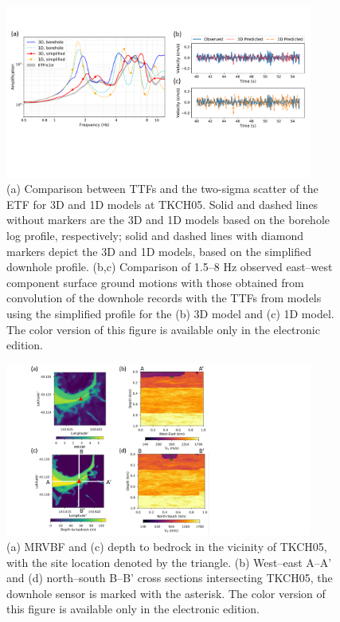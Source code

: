 {\clearpage
\begin{figure}[!ht]
  \centering
  \includegraphics[width=0.9\textwidth]{figures/figure_etf_7.pdf}
  \caption{(a) Comparison between TTFs and the two-sigma scatter of the ETF for 3D and 1D models at TKCH05. Solid and dashed lines without markers are the 3D and 1D models based on the borehole log profile, respectively; solid and dashed lines with diamond markers depict the 3D and 1D models, based on the simplified downhole profile. (b,c) Comparison of 1.5–8 Hz observed east–west component surface ground motions with those obtained from convolution of the downhole records with the TTFs from models using the simplified profile for the (b) 3D model and (c) 1D model. The color version of this figure is available only in the electronic edition.}
  \label{fig:etf-7}
\end{figure}

\clearpage
\begin{figure}[!ht]
  \centering
  \includegraphics[width=0.9\textwidth]{figures/figure_etf_8.pdf}
  \caption{(a) MRVBF and (c) depth to bedrock in the vicinity of TKCH05, with the site location denoted by the triangle. (b) West–east A–A' and (d) north–south B–B' cross sections intersecting TKCH05, the downhole sensor is marked with the asterisk. The color version of this figure is available only in the electronic edition.}
  \label{fig:etf-8}
\end{figure}

}
